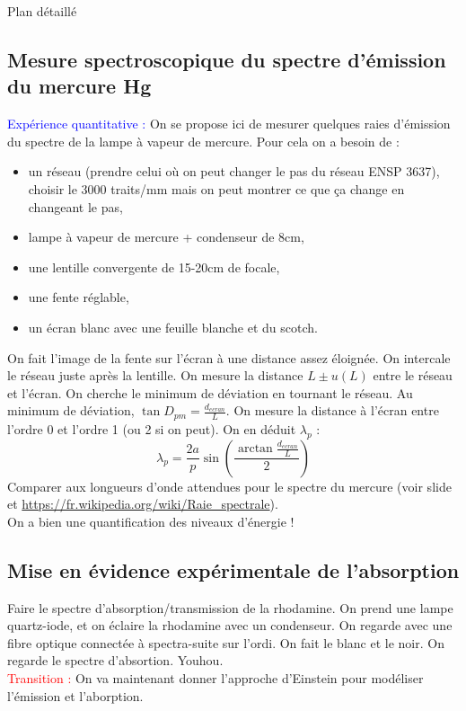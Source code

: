 \begin{reportBlock}{Plan détaillé}
  \subsection{Mesure spectroscopique du spectre d'émission du mercure Hg}
  \textcolor{blue}{Expérience quantitative :} On se propose ici de mesurer quelques raies d'émission du spectre de la lampe à vapeur de mercure. Pour cela on a besoin de :
  \begin{itemize}
      \item un réseau (prendre celui où on peut changer le pas du réseau ENSP 3637), choisir le 3000 traits/mm mais on peut montrer ce que ça change en changeant le pas,
      \item lampe à vapeur de mercure + condenseur de 8cm,
      \item une lentille convergente de 15-20cm de focale,
      \item une fente réglable,
      \item un écran blanc avec une feuille blanche et du scotch.
  \end{itemize}
On fait l'image de la fente sur l'écran à une distance assez éloignée. On intercale le réseau juste après la lentille. On mesure la distance $L\pm u(L)$ entre le réseau et l'écran. On cherche le minimum de déviation en tournant le réseau. Au minimum de déviation, $\tan{D_{pm}}=\frac{d_{ecran}}{L}$. On mesure la distance à l'écran entre l'ordre 0 et l'ordre 1 (ou 2 si on peut). On en déduit $\lambda_p$ :
\begin{equation}
    \lambda_p = \frac{2a}{p}\sin\left(\frac{\arctan{\frac{d_{ecran}}{L}}}{2}\right)
\end{equation}
Comparer aux longueurs d'onde attendues pour le spectre du mercure (voir slide et \url{https://fr.wikipedia.org/wiki/Raie_spectrale}).\\
On a bien une quantification des niveaux d'énergie !

\subsection{Mise en évidence expérimentale de l'absorption}
Faire le spectre d'absorption/transmission de la rhodamine. On prend une lampe quartz-iode, et on éclaire la rhodamine avec un condenseur. On regarde avec une fibre optique connectée à spectra-suite sur l'ordi. On fait le blanc et le noir. On regarde le spectre d'absortion. Youhou.\\

\textcolor{red}{Transition :} On va maintenant donner l'approche d'Einstein pour modéliser l'émission et l'aborption. 


\end{reportBlock}

